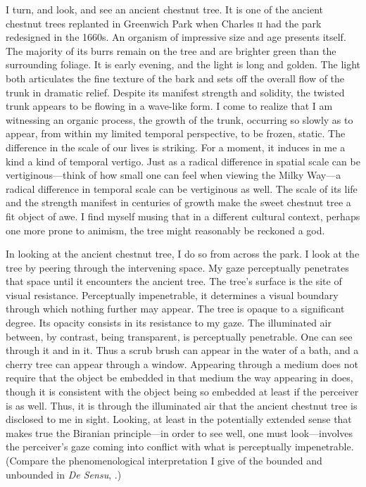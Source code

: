 I turn, and look, and see an ancient chestnut tree. It is one of the ancient chestnut trees replanted in Greenwich Park when Charles \textsc{ii} had the park redesigned in the 1660s. An organism of impressive size and age presents itself. The majority of its burrs remain on the tree and are brighter green than the surrounding foliage. It is early evening, and the light is long and golden. The light both articulates the fine texture of the bark and sets off the overall flow of the trunk in dramatic relief. Despite its manifest strength and solidity, the twisted trunk appears to be flowing in a wave-like form. I come to realize that I am witnessing an organic process, the growth of the trunk, occurring so slowly as to appear, from within my limited temporal perspective, to be frozen, static. The difference in the scale of our lives is striking. For a moment, it induces in me a kind a kind of temporal vertigo.  Just as a radical difference in spatial scale can be vertiginous---think of how small one can feel when viewing the Milky Way---a radical difference in temporal scale can be vertiginous as well. The scale of its life and the strength manifest in centuries of growth make the sweet chestnut tree a fit object of awe. I find myself musing that in a different cultural context, perhaps one more prone to animism, the tree might reasonably be reckoned a god. 

In looking at the ancient chestnut tree, I do so from across the park. I look at the tree by peering through the intervening space. My gaze perceptually penetrates that space until it encounters the ancient tree. The tree's surface is the site of visual resistance. Perceptually impenetrable, it determines a visual boundary through which nothing further may appear. The tree is opaque to a significant degree. Its opacity consists in its resistance to my gaze. The illuminated air between, by contrast, being transparent, is perceptually penetrable. One can see through it and in it. Thus a scrub brush can appear in the water of a bath, and a cherry tree can appear through a window. Appearing through a medium does not require that the object be embedded in that medium the way appearing in does, though it is consistent with the object being so embedded at least if the perceiver is as well. Thus, it is through the illuminated air that the ancient chestnut tree is disclosed to me in sight. Looking, at least in the potentially extended sense that makes true the Biranian principle---in order to see well, one must look---involves the perceiver's gaze coming into conflict with what is perceptually impenetrable. (Compare the phenomenological interpretation I give of the bounded and unbounded in \emph{De Sensu}, \citealt[chapter 3.3]{Kalderon:2015fr}.)

